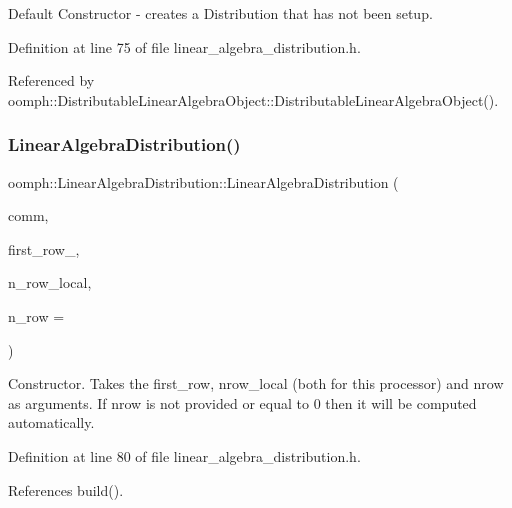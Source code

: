 Default Constructor -\/ creates a Distribution that has not been setup. 



Definition at line 75 of file linear\+\_\+algebra\+\_\+distribution.\+h.



Referenced by oomph\+::\+Distributable\+Linear\+Algebra\+Object\+::\+Distributable\+Linear\+Algebra\+Object().

\mbox{\label{classoomph_1_1LinearAlgebraDistribution_ae8714449bcd3d63c7bb7ebe7e6e01c7a}} 
\subsubsection{\texorpdfstring{Linear\+Algebra\+Distribution()}{LinearAlgebraDistribution()}\hspace{0.1cm}{\footnotesize\ttfamily [2/7]}}
{\footnotesize\ttfamily oomph\+::\+Linear\+Algebra\+Distribution\+::\+Linear\+Algebra\+Distribution (\begin{DoxyParamCaption}\item[{const \hyperlink{classoomph_1_1OomphCommunicator}{Oomph\+Communicator} \&}]{comm,  }\item[{const unsigned \&}]{first\+\_\+row\+\_\+,  }\item[{const unsigned \&}]{n\+\_\+row\+\_\+local,  }\item[{const unsigned \&}]{n\+\_\+row = {} }\end{DoxyParamCaption})\hspace{0.3cm}{\ttfamily [inline]}}



Constructor. Takes the first\+\_\+row, nrow\+\_\+local (both for this processor) and nrow as arguments. If nrow is not provided or equal to 0 then it will be computed automatically. 



Definition at line 80 of file linear\+\_\+algebra\+\_\+distribution.\+h.



References build().

\mbox{\label{classoomph_1_1LinearAlgebraDistribution_a65474439fb8537b2236f933c9225142a}} 

